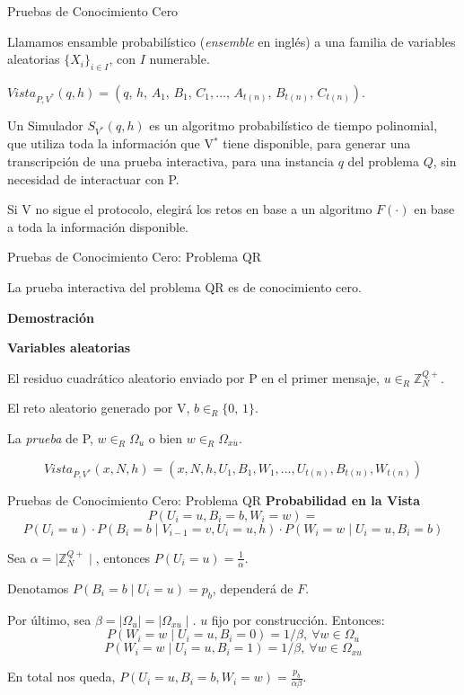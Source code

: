 \documentclass{beamer}
\begin{document}
\begin{frame}{Pruebas de Conocimiento Cero}
	\begin{definition}[Ensamble]
		Llamamos ensamble probabilístico (\textit{ensemble} en inglés) a una familia de variables aleatorias $\{X_i\}_{i\in I}$, con $I$ numerable.
	\end{definition}
	$ Vista_{P,V^*}(q,h) = (q,\,h,\,A_1,\,B_1,\,C_1, \dots ,\,A_{t(n)},\,B_{t(n)},\,C_{t(n)}). $

	\begin{definition}[Simulador]
		Un Simulador $S_{V^*}(q,h)$ es un algoritmo probabilístico de tiempo polinomial, que utiliza toda la información que V$^*$ tiene disponible, para generar una transcripción de una prueba interactiva, para una instancia $q$ del problema $Q$, sin necesidad de interactuar con P.
	\end{definition}
	Si V no sigue el protocolo, elegirá los retos en base a un algoritmo $F(\cdot)$ en base a toda la información disponible.
\end{frame}


\begin{frame}{Pruebas de Conocimiento Cero: Problema QR}
	\begin{theorem}
		La prueba interactiva del problema QR es de conocimiento cero.
	\end{theorem}
	\textbf{Demostración}
	
	\textbf{Variables aleatorias}
	\begin{description}[Wi]
		\item[$U_i$] El residuo cuadrático aleatorio enviado por P en el primer mensaje, $u \in_R \mathbb{Z}^{Q+}_N$.
		
		\item[$B_i$] El reto aleatorio generado por V, $b \in_R \{0,\,1\}$.
		
		\item[$W_i$] La \textit{prueba} de P, $w \in_R \Omega_u$ o bien $w \in_R \Omega_{xu}$.
	\end{description}

	\[  Vista_{P,V^*}(x,N,h) = (x,N,h,U_1,B_1,W_1,\dots , U_{t(n)}, B_{t(n)}, W_{t(n)}) \]
\end{frame}

\begin{frame}{Pruebas de Conocimiento Cero: Problema QR}
	\textbf{Probabilidad en la Vista}
	\[
	P(U_i=u, B_i=b, W_i=w) = 
	\]
	\[ P(U_i=u)\cdot P(B_i=b \mid V_{i-1}=v, U_i=u,h) \cdot P(W_i=w \mid U_i=u, B_i=b) \]
	
	Sea $\alpha = \mid \mathbb{Z}^{Q+}_N \mid $, entonces $P(U_i=u) = \frac{1}{\alpha}$.
	
	Denotamos $ P(B_i=b \mid U_i=u)=p_b$, dependerá de $F$.
	
	Por último, sea $\beta = \mid \Omega_u \mid = \mid \Omega_{xu} \mid $. $u$ fijo por construcción. Entonces:
	\[P(W_i=w \mid U_i=u, B_i=0) = 1/\beta,\ \forall w \in \Omega_u\]
	\[P(W_i=w \mid U_i=u, B_i=1) = 1/\beta,\ \forall w \in \Omega_{xu}\]
	
	En total nos queda, $P(U_i=u, B_i=b, W_i=w) = \frac{p_b}{\alpha \beta}$.
\end{frame}
\end{document}
